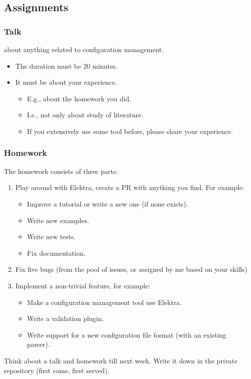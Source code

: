 \subsection{Assignments}
\begin{frame}
	\frametitle{Talk}
	about anything related to configuration management.
	\begin{itemize}
		\item The duration must be 20 minutes.
		\item It must be about your experience.
		\begin{itemize}
			\item E.g., about the homework you did.
			\item I.e., not only about study of literature.
			\item If you extensively use some tool before, please share your experience.
		\end{itemize}
	\end{itemize}
\end{frame}

\begin{frame}
	\frametitle{Homework}
	The homework consists of three parts:
	\begin{enumerate}
		\item Play around with Elektra, create a PR with anything you find.
		For example:
		\begin{itemize}
			\item Improve a tutorial or write a new one (if none exists).
			\item Write new examples.
			\item Write new tests.
			\item Fix documentation.
		\end{itemize}
		\item Fix five bugs (from the pool of issues, or assigned by me based on your skills)
		\item Implement a non-trivial feature, for example:
		\begin{itemize}
			\item Make a configuration management tool use Elektra.
			\item Write a validation plugin.
			\item Write support for a new configuration file format (with an existing parser).
		\end{itemize}
	\end{enumerate}
\end{frame}

\begin{assignment}
	\begin{task}
	Think about a talk and homework till next week.
	Write it down in the private repository (first come, first served).
	\end{task}
\end{assignment}

